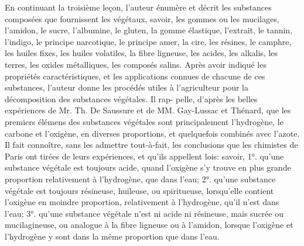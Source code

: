 \setcounter{page}{411} En continuant la troisième leçon, l'auteur énumère et décrit les substances composées que fournissent les végétaux, savoir, les gommes ou les mucilages, l'amidon, le sucre, l'albumine, le gluten, la gomme élastique, l'extrait, le tannin, l'indigo, le principe narcotique, le principe amer, la cire, les résines, le camphre, les huiles fixes, les huiles volatiles, la fibre ligneuse, les acides, les alkalis, les terres, les oxides métalliques, les composés salins.
Après avoir indiqué les propriétés caractéristiques, et les applications connues de chacune de ces substances, l'auteur donne les procédés utiles à l'agriculteur pour la décomposition des substances végétales. Il rap-\setcounter{page}{412} pelle, d'après les belles expériences de Mr. Th. De Saussure et de MM. Gay-Lussac et Thénard, que les premiers élémens des substances végétales sont principalement l'hydrogène, le carbone et l'oxigène, en diverses proportions, et quelquefois combinés avec l'azote. Il fait connoître, sans les admettre tout-à-fait, les conclusions que les chimistes de Paris ont tirées de leurs expériences, et qu'ils appellent lois: savoir, 1°. qu'une substance végétale est toujours acide, quand l'oxigène s'y trouve en plus grande proportion relativement à l'hydrogène, que dans l'eau; 2°. qu'une substance végétale est toujours résineuse, huileuse, ou spiritueuse, lorsqu'elle contient l'oxigène en moindre proportion, relativement à l'hydrogène, qu'il n'est dans l'eau; 3°. qu'une substance végétale n'est ni acide ni résineuse, mais sucrée ou mucilagineuse, ou analogue à la fibre ligneuse ou à l'amidon, lorsque l'oxigène et l'hydrogène y sont dans la même proportion que dans l'eau.
